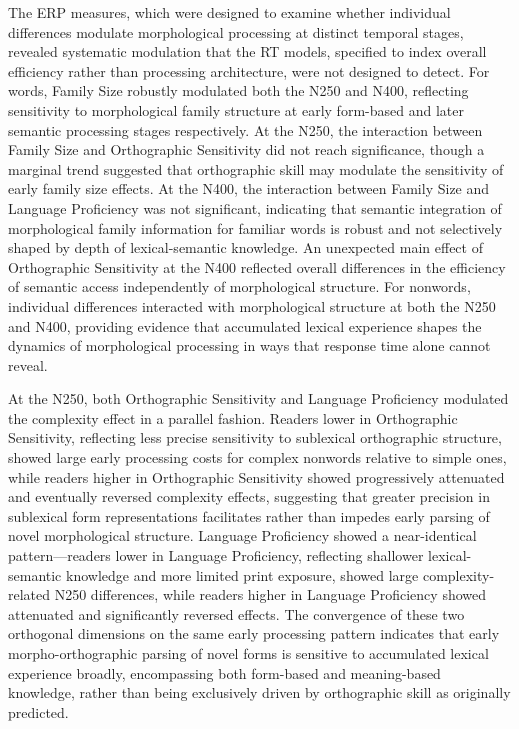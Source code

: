 \documentclass[utf8]{FrontiersinHarvard} %
\begin{document}
The ERP measures, which were designed to examine whether individual differences modulate morphological processing at distinct temporal stages, revealed systematic modulation that the RT models, specified to index overall efficiency rather than processing architecture, were not designed to detect. For words, Family Size robustly modulated both the N250 and N400, reflecting sensitivity to morphological family structure at early form-based and later semantic processing stages respectively. At the N250, the interaction between Family Size and Orthographic Sensitivity did not reach significance, though a marginal trend suggested that orthographic skill may modulate the sensitivity of early family size effects. At the N400, the interaction between Family Size and Language Proficiency was not significant, indicating that semantic integration of morphological family information for familiar words is robust and not selectively shaped by depth of lexical-semantic knowledge. An unexpected main effect of Orthographic Sensitivity at the N400 reflected overall differences in the efficiency of semantic access independently of morphological structure. For nonwords, individual differences interacted with morphological structure at both the N250 and N400, providing evidence that accumulated lexical experience shapes the dynamics of morphological processing in ways that response time alone cannot reveal.

At the N250, both Orthographic Sensitivity and Language Proficiency modulated the complexity effect in a parallel fashion. Readers lower in Orthographic Sensitivity, reflecting less precise sensitivity to sublexical orthographic structure, showed large early processing costs for complex nonwords relative to simple ones, while readers higher in Orthographic Sensitivity showed progressively attenuated and eventually reversed complexity effects, suggesting that greater precision in sublexical form representations facilitates rather than impedes early parsing of novel morphological structure. Language Proficiency showed a near-identical pattern—readers lower in Language Proficiency, reflecting shallower lexical-semantic knowledge and more limited print exposure, showed large complexity-related N250 differences, while readers higher in Language Proficiency showed attenuated and significantly reversed effects. The convergence of these two orthogonal dimensions on the same early processing pattern indicates that early morpho-orthographic parsing of novel forms is sensitive to accumulated lexical experience broadly, encompassing both form-based and meaning-based knowledge, rather than being exclusively driven by orthographic skill as originally predicted.
\end{document}
